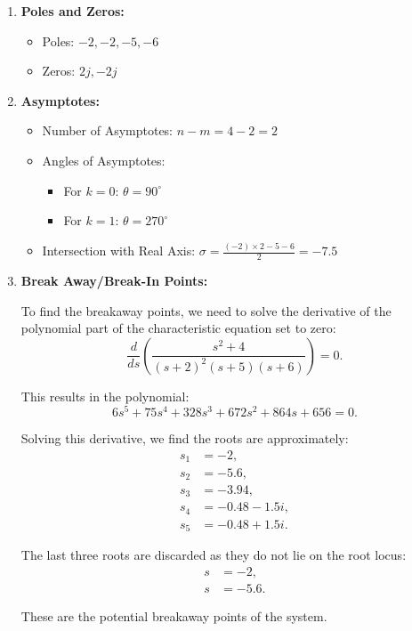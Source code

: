 \documentclass[11pt]{article}
\begin{document}
\begin{enumerate}
    \item \textbf{Poles and Zeros:}
    \begin{itemize}
        \item Poles: \( -2, -2, -5, -6 \)
        \item Zeros: \( 2j, -2j \)
    \end{itemize}

    \item \textbf{Asymptotes:}
    \begin{itemize}
        \item Number of Asymptotes: \( n - m = 4 - 2 = 2 \)
        \item Angles of Asymptotes: 
        \begin{itemize}
            \item For \( k = 0 \): \( \theta = 90^\circ \)
            \item For \( k = 1 \): \( \theta = 270^\circ \)
        \end{itemize}
        \item Intersection with Real Axis: \( \sigma = \frac{(-2) \times 2 - 5 - 6}{2} = -7.5 \)
    \end{itemize}

    \item \textbf{Break Away/Break-In Points:}

To find the breakaway points, we need to solve the derivative of the polynomial part of the characteristic equation set to zero:
\[
\frac{d}{ds}\left( \frac{s^2+4}{(s+2)^2(s+5)(s+6)} \right) = 0.
\]

This results in the polynomial:
\[
6s^5 + 75s^4 + 328s^3 + 672s^2 + 864s + 656 = 0.
\]

Solving this derivative, we find the roots are approximately:
\begin{align*}
s_1 &= -2, \\
s_2 &= -5.6, \\
s_3 &= -3.94, \\
s_4 &= -0.48 - 1.5i, \\
s_5 &= -0.48 + 1.5i.
\end{align*}

The last three roots are discarded as they do not lie on the root locus:
\begin{align*}
s &= -2, \\
s &= -5.6.
\end{align*}

These are the potential breakaway points of the system.



\end{enumerate}
\end{document}
